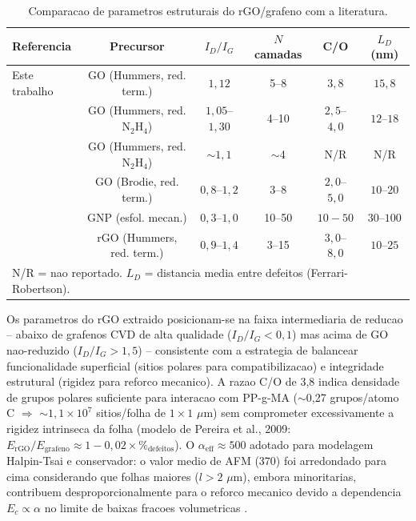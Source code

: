 \documentclass[11pt,a4paper,oneside]{article}
\begin{document}
\begin{table}[H]\centering
\caption{Comparacao de parametros estruturais do rGO/grafeno com a literatura.}\label{tab:rgo_lit}
\begin{tabular}{lccccc}
\toprule
{\bfseries Referencia} & {\bfseries Precursor} & {\bfseries $I_D/I_G$} & {\bfseries $N$ camadas} & {\bfseries C/O} & {\bfseries $L_D$ (nm)} \\
\midrule
Este trabalho        & GO (Hummers, red. term.) & $1{,}12$ & 5--8 & $3{,}8$ & $15{,}8$ \\
\cite{Faria2017}     & GO (Hummers, red. N$_2$H$_4$) & $1{,}05$--$1{,}30$ & 4--10 & $2{,}5$--$4{,}0$ & $12$--$18$ \\
\cite{Stankovich2006}& GO (Hummers, red. N$_2$H$_4$) & ${\sim}1{,}1$ & ${\sim}$4 & N/R & N/R \\
\cite{Papageorgiou2017}& GO (Brodie, red. term.) & $0{,}8$--$1{,}2$ & 3--8 & $2{,}0$--$5{,}0$ & $10$--$20$ \\
\cite{Kumar2022}     & GNP (esfol. mecan.)  & $0{,}3$--$1{,}0$ & 10--50 & $10{-}50$ & $30$--$100$ \\
\cite{Araby2020}     & rGO (Hummers, red. term.) & $0{,}9$--$1{,}4$ & 3--15 & $3{,}0$--$8{,}0$ & $10$--$25$ \\
\bottomrule
\multicolumn{6}{l}{\footnotesize N/R = nao reportado. $L_D$ = distancia media entre defeitos (Ferrari-Robertson).}\\
\end{tabular}
\end{table}

Os parametros do rGO extraido posicionam-se na faixa intermediaria de reducao -- abaixo de grafenos CVD de alta qualidade ($I_D/I_G{<}0{,}1$) mas acima de GO nao-reduzido ($I_D/I_G{>}1{,}5$) -- consistente com a estrategia de balancear funcionalidade superficial (sitios polares para compatibilizacao) e integridade estrutural (rigidez para reforco mecanico). A razao C/O de 3,8 indica densidade de grupos polares suficiente para interacao com PP-g-MA ($\sim$0,27 grupos/atomo C $\Rightarrow$ ${\sim}1{,}1{\times}10^7$ sitios/folha de $1{\times}1$ $\mu$m) sem comprometer excessivamente a rigidez intrinseca da folha (modelo de Pereira et al., 2009: $E_{\text{rGO}}/E_{\text{grafeno}}{\approx}1{-}0{,}02{\times}\%_{\text{defeitos}}$). O $\alpha_{\text{eff}}{\approx}500$ adotado para modelagem Halpin-Tsai e conservador: o valor medio de AFM (370) foi arredondado para cima considerando que folhas maiores ($l{>}2$ $\mu$m), embora minoritarias, contribuem desproporcionalmente para o reforco mecanico devido a dependencia $E_c{\propto}\alpha$ no limite de baixas fracoes volumetricas \cite{Halpin1976, Young2012}.
\end{document}
